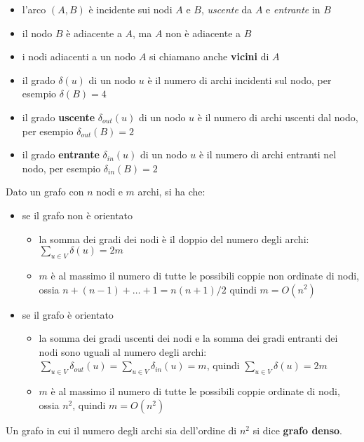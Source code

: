\documentclass[12pt]{article}
\begin{document}
\begin{itemize}
    \item l'arco $(A,B)$ è incidente sui nodi $A$ e $B$, \textit{uscente} da $A$ e \textit{entrante} in $B$
    \item il nodo $B$ è adiacente a $A$, ma $A$ non è adiacente a $B$
    \item i nodi adiacenti a un nodo $A$ si chiamano anche \textbf{vicini} di $A$
    \item il grado $\delta (u)$ di un nodo $u$ è il numero di archi incidenti sul nodo, per esempio $\delta(B)=4$
    \item il grado \textbf{uscente} $\delta_{out}(u)$ di un nodo $u$ è il numero di archi uscenti dal nodo, per esempio $\delta_{out}(B)=2$
    \item il grado \textbf{entrante} $\delta_{in}(u)$ di un nodo $u$ è il numero di archi entranti nel nodo, per esempio $\delta_{in}(B)=2$
\end{itemize}
Dato un grafo con $n$ nodi e $m$ archi, si ha che:
\begin{itemize}
    \item se il grafo non è orientato \begin{itemize}
        \item la somma dei gradi dei nodi è il doppio del numero degli archi: \(\sum_{u\in V}\delta(u)=2m\)
        \item $m$ è al massimo il numero di tutte le possibili coppie non ordinate di nodi, ossia \(n+(n-1)+\dots+1=n(n+1)/2\) quindi $m=O(n^{2})$
    \end{itemize}
    \item se il grafo è orientato \begin{itemize}
        \item la somma dei gradi uscenti dei nodi e la somma dei gradi entranti dei nodi sono uguali al numero degli archi: \(\sum_{u\in V}\delta_{out}(u)=\sum_{u\in V}\delta_{in}(u)=m\), quindi \(\sum_{u\in V}\delta(u)=2m\)
        \item $m$ è al massimo il numero di tutte le possibili coppie ordinate di nodi, ossia $n^{2}$, quindi $m=O(n^{2})$
    \end{itemize} 
\end{itemize}
Un grafo in cui il numero degli archi sia dell'ordine di $n^{2}$ si dice \textbf{grafo denso}.
\end{document}
